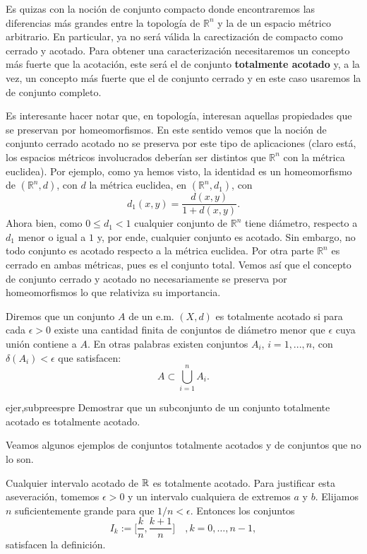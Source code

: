 Es quizas con la noción de conjunto compacto donde encontraremos
las diferencias más grandes entre la topología de $\mathbb{R}^n$
y la de un espacio métrico arbitrario. En particular, ya no será
válida la carectización de compacto como cerrado y acotado. Para
obtener una caracterización necesitaremos un concepto más fuerte
que la acotación, este será el de conjunto \textbf{totalmente
acotado} y, a la vez, un concepto más fuerte que el de conjunto
cerrado y en este caso usaremos la de conjunto completo.

Es interesante hacer notar que, en topología, interesan aquellas
propiedades que se preservan por homeomorfismos. En este sentido
vemos que la noción de conjunto cerrado acotado no se preserva
por este tipo de aplicaciones (claro está, los espacios métricos
involucrados deberían ser distintos que $\mathbb{R}^n$ con la
métrica euclidea). Por ejemplo, como ya hemos visto, la identidad
es un homeomorfismo de $(\mathbb{R}^n,d)$, con $d$ la métrica
euclidea, en $(\mathbb{R}^n,d_1)$, con
\[
	d_1(x,y)=\frac{d(x,y)}{1+d(x,y)}.
\]
Ahora bien, como $0\leq d_1<1$ cualquier conjunto de
$\mathbb{R}^n$ tiene diámetro, respecto a $d_1$ menor o igual a
$1$ y, por ende, cualquier conjunto es acotado. Sin embargo, no
todo conjunto es acotado respecto a la métrica euclidea. Por otra
parte $\mathbb{R}^n$ es cerrado en ambas métricas, pues es el
conjunto total. Vemos así que el concepto de conjunto cerrado y
acotado no necesariamente se preserva por homeomorfismos lo que
relativiza su importancia.



\begin{definicion}{}  Diremos que un conjunto $A$ de un e.m. $(X,d)$
es totalmente acotado
si para cada $\epsilon>0$ existe una cantidad finita de conjuntos
de diámetro menor que $\epsilon$ cuya unión contiene a  $A$.
En otras palabras existen conjuntos $A_i$, $i=1,...,n$, con
$\delta(A_i)<\epsilon$ que satisfacen:
\[
	A\subset \bigcup\limits_{i=1}^nA_i.
\]
\end{definicion}


\begin{ejercicio}{ejer,subpreespre} Demostrar que un
subconjunto de un conjunto totalmente acotado es totalmente
acotado.
\end{ejercicio}


Veamos algunos ejemplos de conjuntos totalmente acotados y de
conjuntos que no lo son.

\begin{ejemplo}{} Cualquier intervalo acotado de $\mathbb{R}$ es
totalmente acotado. Para justificar esta aseveración, tomemos
$\epsilon>0$ y un intervalo cualquiera de extremos $a$ y $b$.
Elijamos $n$ suficientemente grande para que $1/n<\epsilon$.
Entonces los conjuntos
\[
	I_k:=\Big[\frac{k}{n},\frac{k+1}{n}\Big]\quad ,k=0,\ldots,n-1,
\]
satisfacen la definición.
\end{ejemplo}

